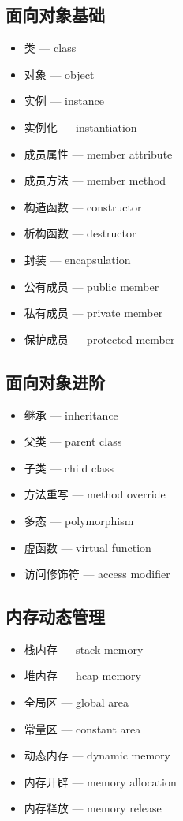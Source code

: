 \subsection{面向对象基础}
\begin{itemize}
\item 类 — class
\item 对象 — object
\item 实例 — instance
\item 实例化 — instantiation
\item 成员属性 — member attribute
\item 成员方法 — member method
\item 构造函数 — constructor
\item 析构函数 — destructor
\item 封装 — encapsulation
\item 公有成员 — public member
\item 私有成员 — private member
\item 保护成员 — protected member
\end{itemize}

\subsection{面向对象进阶}
\begin{itemize}
\item 继承 — inheritance
\item 父类 — parent class
\item 子类 — child class
\item 方法重写 — method override
\item 多态 — polymorphism
\item 虚函数 — virtual function
\item 访问修饰符 — access modifier
\end{itemize}

\subsection{内存动态管理}
\begin{itemize}
\item 栈内存 — stack memory
\item 堆内存 — heap memory
\item 全局区 — global area
\item 常量区 — constant area
\item 动态内存 — dynamic memory
\item 内存开辟 — memory allocation
\item 内存释放 — memory release
\end{itemize}

